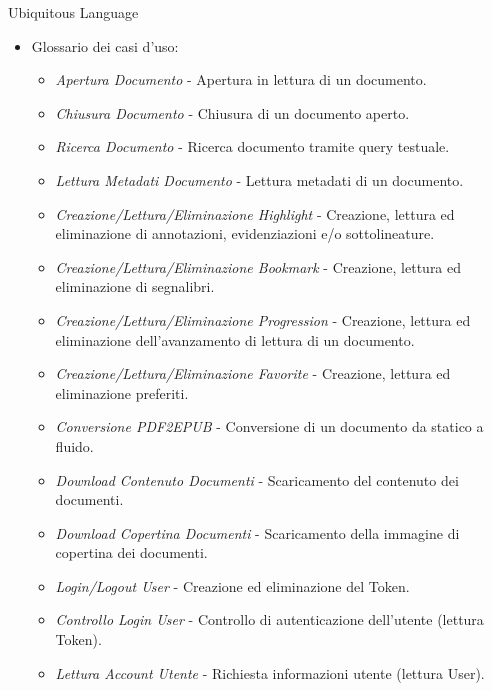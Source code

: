     \begin{frame}{Ubiquitous Language}
        \begin{itemize}
            \item Glossario dei casi d'uso:
                \begin{itemize}
                    \item \textit{Apertura Documento} - Apertura in lettura di un documento.
                    \item \textit{Chiusura Documento} - Chiusura di un documento aperto.
                    \item \textit{Ricerca Documento} - Ricerca documento tramite query testuale.
                    \item \textit{Lettura Metadati Documento} - Lettura metadati di un documento.
                    \item \textit{Creazione/Lettura/Eliminazione Highlight} - Creazione, lettura ed eliminazione di annotazioni, evidenziazioni e/o sottolineature.
                    \item \textit{Creazione/Lettura/Eliminazione Bookmark} - Creazione, lettura ed eliminazione di segnalibri.
                    \item \textit{Creazione/Lettura/Eliminazione Progression} - Creazione, lettura ed eliminazione dell'avanzamento di lettura di un documento.
                    \item \textit{Creazione/Lettura/Eliminazione Favorite} - Creazione, lettura ed eliminazione preferiti.
                    \item \textit{Conversione PDF2EPUB} - Conversione di un documento da statico a fluido.
                    \item \textit{Download Contenuto Documenti} - Scaricamento del contenuto dei documenti.
                    \item \textit{Download Copertina Documenti} - Scaricamento della immagine di copertina dei documenti.
                    \item \textit{Login/Logout User} - Creazione ed eliminazione del Token.
                    \item \textit{Controllo Login User} - Controllo di autenticazione dell'utente (lettura Token).
                    \item \textit{Lettura Account Utente} - Richiesta informazioni utente (lettura User).
                \end{itemize}
        \end{itemize}
    \end{frame}

